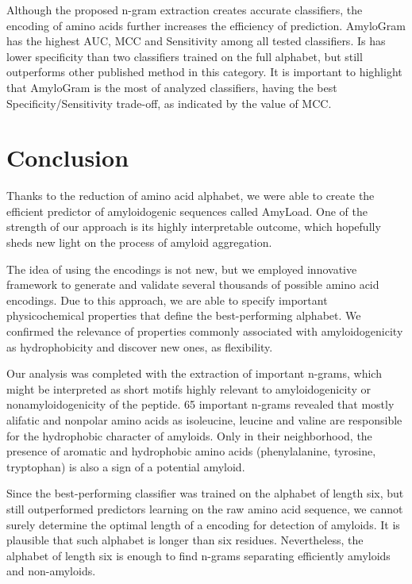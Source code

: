 \documentclass[a4,center,fleqn]{NAR}
\begin{document}
  Although the proposed n-gram extraction creates accurate classifiers, the 
encoding of amino acids further increases the efficiency of prediction. 
AmyloGram has the highest AUC, MCC and Sensitivity among all tested classifiers. 
Is has lower specificity than two classifiers trained on the full alphabet, but 
still outperforms other published method in this category. It is important to 
highlight that AmyloGram is the most  of analyzed classifiers, having 
the best Specificity/Sensitivity trade-off, as indicated by the value of MCC.

\section{Conclusion}

Thanks to the reduction of amino acid alphabet, we were able to create the 
efficient predictor of amyloidogenic sequences called AmyLoad. One of the 
strength of our approach is its highly interpretable outcome, which hopefully 
sheds new light on the process of amyloid aggregation.

  The idea of using the encodings is not new, but we employed 
innovative framework to generate and validate several thousands of possible 
amino acid encodings. Due to this approach, we are able to specify important 
physicochemical properties that define the best-performing alphabet. We 
confirmed the relevance of properties commonly associated with amyloidogenicity 
as hydrophobicity and discover new ones, as flexibility.  

  Our analysis was completed with the extraction of important n-grams, which 
might be interpreted as short motifs highly relevant to amyloidogenicity or 
nonamyloidogenicity of the peptide. 65 important n-grams revealed that mostly 
alifatic and nonpolar amino acids as isoleucine, leucine and valine are 
responsible for the hydrophobic character of amyloids. Only in their 
%
%
%
neighborhood, the presence of aromatic and hydrophobic amino acids 
(phenylalanine, tyrosine, tryptophan) is also a sign of a potential amyloid. 

  Since the best-performing classifier was trained on the alphabet of length 
six, but still outperformed predictors learning on the raw amino acid sequence, 
we cannot surely determine the optimal length of a encoding 
for detection of amyloids. It is plausible that such alphabet is longer than 
six residues. Nevertheless, the alphabet of length six is enough to find 
n-grams separating efficiently amyloids and non-amyloids. 
\end{document}
